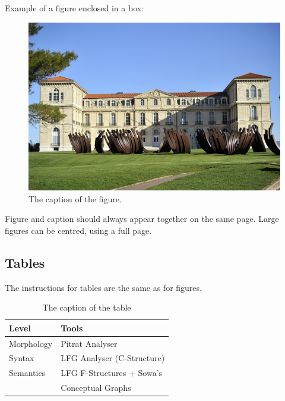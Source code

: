 \documentclass[10pt, a4paper]{article}
\begin{document}
Example of a figure enclosed in a box:

\begin{figure}[!h]
\begin{center}
\includegraphics[scale=0.5]{pharo-marseille-3.jpg} 

\caption{The caption of the figure.}
\label{fig.1}
\end{center}
\end{figure}

Figure and caption should always appear together on the same page. Large figures can be centred, using a full page.

\subsection{Tables}

The instructions for tables are the same as for figures.
%
\begin{table}[!h]
\begin{center}
\begin{tabularx}{\columnwidth}{|l|X|}

      \hline
      Level&Tools\\
      \hline
      Morphology & Pitrat Analyser\\
      \hline
      Syntax & LFG Analyser (C-Structure)\\
      \hline
     Semantics & LFG F-Structures + Sowa's\\
     & Conceptual Graphs\\
      \hline

\end{tabularx}
\caption{The caption of the table}
 \end{center}
\end{table}
\end{document}

